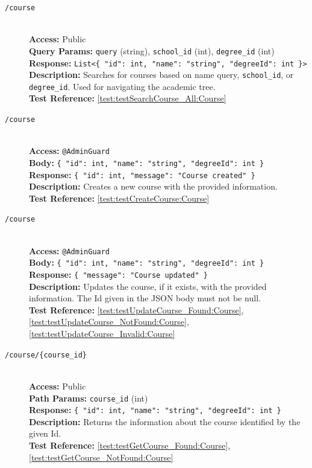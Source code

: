 \begin{description}
	\item[\GET \quad \texttt{/course}] \hfill \\
	\textbf{Access:} Public \\
	\textbf{Query Params:} \texttt{query} (string), \texttt{school\_id} (int), \texttt{degree\_id} (int) \\
	\textbf{Response:} \texttt{List<\{ "id": int, "name": "string", "degreeId": int \}>} \\
	\textbf{Description:} Searches for courses based on name query, \texttt{school\_id}, or \texttt{degree\_id}. Used for navigating the academic tree.\\
	\textbf{Test Reference:} \ref{test:testSearchCourse_All:Course}
	
	\item[\POST \quad \texttt{/course}] \hfill \\
	\textbf{Access:} \texttt{@AdminGuard} \\
	\textbf{Body:} \texttt{\{ "id": int, "name": "string", "degreeId": int \}} \\
	\textbf{Response:} \texttt{\{ "id": int, "message": "Course created" \}} \\
	\textbf{Description:} Creates a new course with the provided information.\\
	\textbf{Test Reference:} \ref{test:testCreateCourse:Course}
	
	\item[\PUT \quad \texttt{/course}] \hfill \\
	\textbf{Access:} \texttt{@AdminGuard} \\
	\textbf{Body:} \texttt{\{ "id": int, "name": "string", "degreeId": int \}} \\
	\textbf{Response:} \texttt{\{ "message": "Course updated" \}} \\
	\textbf{Description:} Updates the course, if it exists, with the provided information. The Id given in the JSON body must not be null.\\
	\textbf{Test Reference:} \ref{test:testUpdateCourse_Found:Course}, \ref{test:testUpdateCourse_NotFound:Course}, \ref{test:testUpdateCourse_Invalid:Course}
	
	\item[\GET \quad \texttt{/course/\{course\_id\}}] \hfill \\
	\textbf{Access:} Public \\
	\textbf{Path Params:} \texttt{course\_id} (int) \\
	\textbf{Response:} \texttt{\{ "id": int, "name": "string", "degreeId": int \}} \\
	\textbf{Description:} Returns the information about the course identified by the given Id.\\
	\textbf{Test Reference:} \ref{test:testGetCourse_Found:Course}, \ref{test:testGetCourse_NotFound:Course}
	

\end{description}
